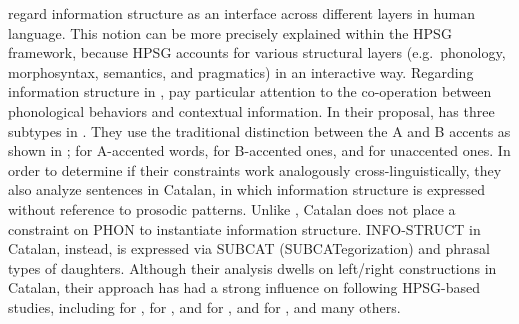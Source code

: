

\citet{engdahl:vallduvi:96} regard information structure as an
interface across different layers in human language.  This notion can
be more precisely explained within the HPSG framework, because HPSG
accounts for various structural layers (e.g.\ phonology,
morphosyntax, semantics, and pragmatics) in an interactive
way. Regarding information structure in ,
\citeauthor{engdahl:vallduvi:96} pay particular attention to the
co-operation between phonological behaviors and contextual
information.  In their proposal,  has three subtypes in
. They use the traditional distinction between the A and
B accents as shown in 
\citep{bolinger:58,jackendoff:72};  for A-accented words,
 for B-accented ones, and  for unaccented
ones. In order to determine if their
constraints work analogously cross-linguistically, they also analyze
sentences in Catalan, in which information structure is expressed
without reference to prosodic patterns. Unlike , Catalan
does not place a constraint on PHON to instantiate information
structure. INFO-STRUCT in Catalan, instead, is expressed via SUBCAT
(SUBCATegorization) and phrasal types of daughters.  Although their
analysis dwells on left/right  constructions in
Catalan, their approach has had a strong influence on following
HPSG-based studies, including \citet{dekuthy:00} for ,
\citet{bildhauer:07} for , \citet{chang:02} and
\citet{chung:etal:03} for , \citet{ohtani:matsumoto:04}
and \citet{yoshimoto:etal:06} for , and many
others. 


